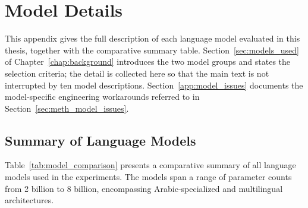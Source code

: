 \chapter{Model Details}
\setcounter{page}{1}
\label{app:model_details}

This appendix gives the full description of each language model evaluated in this
thesis, together with the comparative summary table. Section~\ref{sec:models_used}
of Chapter~\ref{chap:background} introduces the two model groups and states the
selection criteria; the detail is collected here so that the main text is not
interrupted by ten model descriptions. Section~\ref{app:model_issues} documents the
model-specific engineering workarounds referred to in Section~\ref{sec:meth_model_issues}.

\section{Summary of Language Models}
\label{app:model_summary}

Table~\ref{tab:model_comparison} presents a comparative summary of all language
models used in the experiments. The models span a range of parameter counts from
2 billion to 8 billion, encompassing Arabic-specialized and multilingual architectures.

